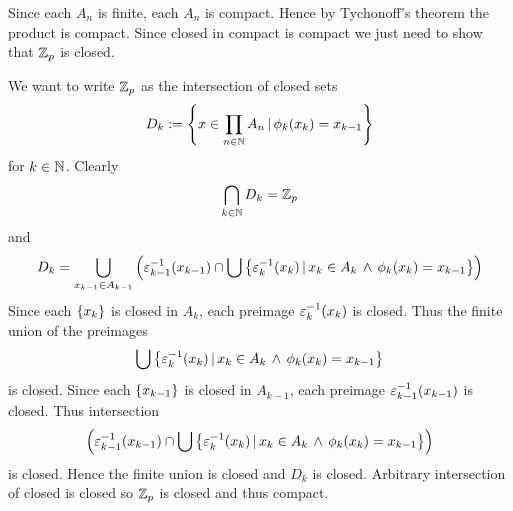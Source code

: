 \begin{prop}[$\Z_p$ is compact]
    Since each $A_n$ is finite, 
    each $A_n$ is compact.
    Hence by Tychonoff's theorem
    the product is compact.
    Since closed in compact is compact
    we just need to show that $\Z_p$ is closed.

    We want to write $\Z_p$ as the intersection of 
    closed sets 
    \[D_k:= \left\{x \in \prod_{n\in\mathbb{N}} A_n \,|\, \phi_k (x_k) = x_{k-1}\right\}\]
    for $k \in \mathbb{N}$.
    Clearly 
    \[\bigcap_{k\in\mathbb{N}} D_k = \mathbb{Z}_p\]
    and 
    \[D_k = \bigcup_{x_{k-1} \in A_{k-1}} \left(\varepsilon_{k-1}^{-1}(x_{k-1}) 
    \cap \bigcup 
    \left\{\varepsilon_k^{-1}(x_k) \,|\, x_k \in A_k \, \land \, \phi_k(x_k) = x_{k-1}\right\}\right)\]
    Since each $\left\{x_k\right\}$ is closed in $A_k$, 
    each preimage $\varepsilon_k^{-1}(x_k)$ is closed.
    Thus the finite union of the preimages
    \[\bigcup 
    \left\{\varepsilon_k^{-1}(x_k) \,|\, x_k \in A_k \, \land \, \phi_k(x_k) = x_{k-1}\right\}\]
    is closed.
    Since each $\left\{x_{k-1}\right\}$ is closed in $A_{k-1}$, 
    each preimage $\varepsilon_{k-1}^{-1}(x_{k-1})$ is closed.
    Thus intersection 
    \[\left(\varepsilon_{k-1}^{-1}(x_{k-1}) 
    \cap \bigcup 
    \left\{\varepsilon_k^{-1}(x_k) \,|\, x_k \in A_k \, \land \, \phi_k(x_k) = x_{k-1}\right\}\right)\]
    is closed.
    Hence the finite union is closed and $D_k$ is closed.
    Arbitrary intersection of closed is closed so $\Z_p$ 
    is closed and thus compact.
\end{prop}

